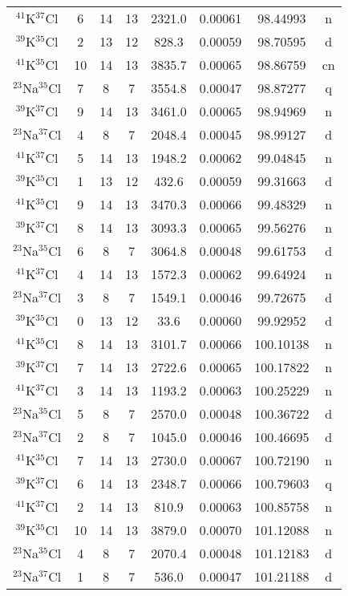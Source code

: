 \begin{table*}[htp]
\begin{tabular}{cccccccc}
$^{41}$K$^{37}$Cl & 6 & 14 & 13 & 2321.0 & 0.00061 & 98.44993 & n \\
$^{39}$K$^{35}$Cl & 2 & 13 & 12 & 828.3 & 0.00059 & 98.70595 & d \\
$^{41}$K$^{35}$Cl & 10 & 14 & 13 & 3835.7 & 0.00065 & 98.86759 & cn \\
$^{23}$Na$^{35}$Cl & 7 & 8 & 7 & 3554.8 & 0.00047 & 98.87277 & q \\
$^{39}$K$^{37}$Cl & 9 & 14 & 13 & 3461.0 & 0.00065 & 98.94969 & n \\
$^{23}$Na$^{37}$Cl & 4 & 8 & 7 & 2048.4 & 0.00045 & 98.99127 & d \\
$^{41}$K$^{37}$Cl & 5 & 14 & 13 & 1948.2 & 0.00062 & 99.04845 & n \\
$^{39}$K$^{35}$Cl & 1 & 13 & 12 & 432.6 & 0.00059 & 99.31663 & d \\
$^{41}$K$^{35}$Cl & 9 & 14 & 13 & 3470.3 & 0.00066 & 99.48329 & n \\
$^{39}$K$^{37}$Cl & 8 & 14 & 13 & 3093.3 & 0.00065 & 99.56276 & n \\
$^{23}$Na$^{35}$Cl & 6 & 8 & 7 & 3064.8 & 0.00048 & 99.61753 & d \\
$^{41}$K$^{37}$Cl & 4 & 14 & 13 & 1572.3 & 0.00062 & 99.64924 & n \\
$^{23}$Na$^{37}$Cl & 3 & 8 & 7 & 1549.1 & 0.00046 & 99.72675 & d \\
$^{39}$K$^{35}$Cl & 0 & 13 & 12 & 33.6 & 0.00060 & 99.92952 & d \\
$^{41}$K$^{35}$Cl & 8 & 14 & 13 & 3101.7 & 0.00066 & 100.10138 & n \\
$^{39}$K$^{37}$Cl & 7 & 14 & 13 & 2722.6 & 0.00065 & 100.17822 & n \\
$^{41}$K$^{37}$Cl & 3 & 14 & 13 & 1193.2 & 0.00063 & 100.25229 & n \\
$^{23}$Na$^{35}$Cl & 5 & 8 & 7 & 2570.0 & 0.00048 & 100.36722 & d \\
$^{23}$Na$^{37}$Cl & 2 & 8 & 7 & 1045.0 & 0.00046 & 100.46695 & d \\
$^{41}$K$^{35}$Cl & 7 & 14 & 13 & 2730.0 & 0.00067 & 100.72190 & n \\
$^{39}$K$^{37}$Cl & 6 & 14 & 13 & 2348.7 & 0.00066 & 100.79603 & q \\
$^{41}$K$^{37}$Cl & 2 & 14 & 13 & 810.9 & 0.00063 & 100.85758 & n \\
$^{39}$K$^{35}$Cl & 10 & 14 & 13 & 3879.0 & 0.00070 & 101.12088 & n \\
$^{23}$Na$^{35}$Cl & 4 & 8 & 7 & 2070.4 & 0.00048 & 101.12183 & d \\
$^{23}$Na$^{37}$Cl & 1 & 8 & 7 & 536.0 & 0.00047 & 101.21188 & d \\
\hline
\end{tabular}

\par 
\end{table*}
